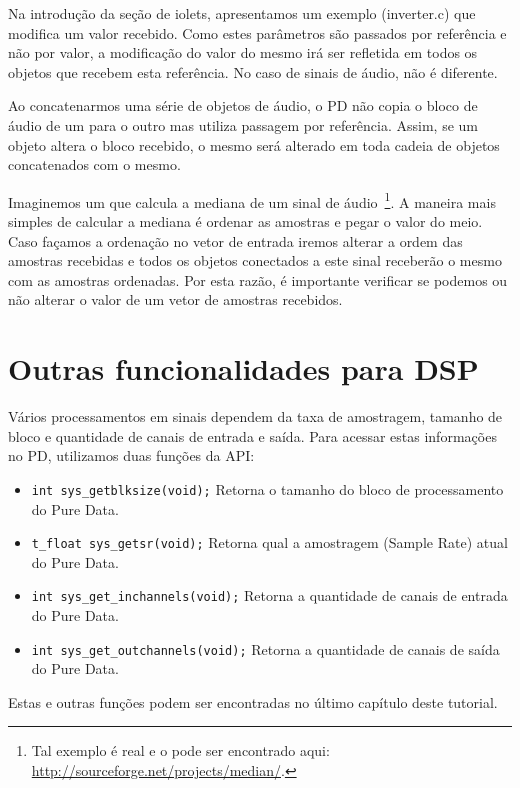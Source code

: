 Na introdução da seção de iolets, apresentamos um exemplo (inverter.c) que
modifica um valor recebido.
Como estes parâmetros são passados por referência e não por valor, a modificação
do valor do mesmo irá ser refletida em todos os objetos que recebem esta referência.
No caso de sinais de áudio, não é diferente.

Ao concatenarmos uma série de objetos de áudio, o PD não copia o bloco de áudio
de um para o outro mas utiliza passagem por referência.
Assim, se um objeto altera o bloco recebido, o mesmo será alterado em toda cadeia
de objetos concatenados com o mesmo.

Imaginemos um \external que calcula a mediana de um sinal de
áudio~\footnote{Tal exemplo é real e o \external pode ser encontrado aqui:
\url{http://sourceforge.net/projects/median/}.}.
A maneira mais simples de calcular a mediana é ordenar as amostras e pegar o
valor do meio.
Caso façamos a ordenação no vetor de entrada iremos alterar a ordem das amostras
recebidas e todos os objetos conectados a este sinal receberão o mesmo com as
amostras ordenadas.
Por esta razão, é importante verificar se podemos ou não alterar o valor de um
vetor de amostras recebidos.

\section{Outras funcionalidades para DSP}

Vários processamentos em sinais dependem da taxa de amostragem, tamanho de bloco
e quantidade de canais de entrada e saída.
Para acessar estas informações no PD, utilizamos duas funções da API:

\begin{itemize}
\item \texttt{int sys\_getblksize(void);}
   Retorna o tamanho do bloco de processamento do Pure Data.
\item  \texttt{t\_float sys\_getsr(void);}
Retorna qual a amostragem (Sample Rate) atual do Pure Data.
\item \texttt{int sys\_get\_inchannels(void);}
Retorna a quantidade de canais de entrada do Pure Data.
\item \texttt{int sys\_get\_outchannels(void);}
Retorna a quantidade de canais de saída do Pure Data.
\end{itemize}

Estas e outras funções podem ser encontradas no último capítulo deste tutorial.
